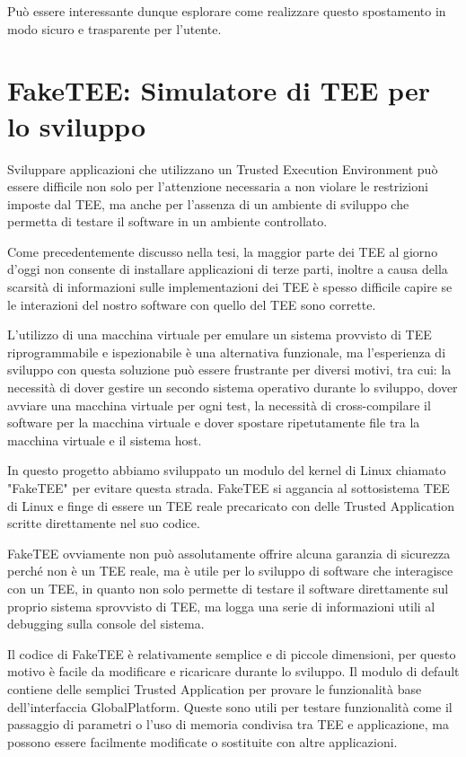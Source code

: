 \documentclass[12pt,italian]{report}
\begin{document}
Può essere interessante dunque esplorare come realizzare questo spostamento
in modo sicuro e trasparente per l'utente.

\appendix
\chapter{FakeTEE: Simulatore di TEE per lo sviluppo}
\label{app:faketee}
Sviluppare applicazioni che utilizzano un Trusted Execution Environment può
essere difficile non solo per l'attenzione necessaria a non violare
le restrizioni imposte dal TEE, ma anche per l'assenza di un ambiente di
sviluppo che permetta di testare il software in un ambiente controllato.

Come precedentemente discusso nella tesi, la maggior parte dei TEE al giorno
d'oggi non consente di installare applicazioni di terze parti, inoltre
a causa della scarsità di informazioni sulle implementazioni dei TEE
è spesso difficile capire se le interazioni del nostro software con quello
del TEE sono corrette.

L'utilizzo di una macchina virtuale per emulare un sistema provvisto di TEE
riprogrammabile e ispezionabile è una alternativa funzionale, ma
l'esperienza di sviluppo con questa soluzione può essere frustrante per
diversi motivi, tra cui: la necessità di dover gestire un secondo sistema
operativo durante lo sviluppo, dover avviare una macchina virtuale per ogni
test, la necessità di cross-compilare il software per la macchina virtuale
e dover spostare ripetutamente file tra la macchina virtuale e il sistema
host.

In questo progetto abbiamo sviluppato un modulo del kernel di Linux chiamato
"FakeTEE" per evitare questa strada. FakeTEE si aggancia al sottosistema TEE
di Linux e finge di essere un TEE reale precaricato con delle
Trusted Application scritte direttamente nel suo codice.

FakeTEE ovviamente non può assolutamente offrire alcuna garanzia di sicurezza
perché non è un TEE reale, ma è utile per lo sviluppo di software che
interagisce con un TEE, in quanto non solo permette di testare il software
direttamente sul proprio sistema sprovvisto di TEE, ma logga una serie di
informazioni utili al debugging sulla console del sistema.

Il codice di FakeTEE è relativamente semplice e di piccole dimensioni, per
questo motivo è facile da modificare e ricaricare durante lo sviluppo.
Il modulo di default contiene delle semplici Trusted Application per provare
le funzionalità base dell'interfaccia GlobalPlatform.
Queste sono utili per testare funzionalità come il passaggio di parametri o
l'uso di memoria condivisa tra TEE e applicazione, ma possono essere
facilmente modificate o sostituite con altre applicazioni.
\end{document}
